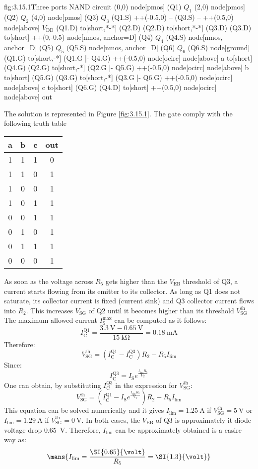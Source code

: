 \begin{circuit}{fig:3.15.1}{Three ports NAND circuit}
    (0,0) node[pmos] (Q1) {$Q_1$}
    (2,0) node[pmos] (Q2) {$Q_2$}
    (4,0) node[pmos] (Q3) {$Q_3$}
    (Q1.S) ++(-0.5,0) -- (Q3.S) -- ++(0.5,0)
    node[above] {$V_\text{DD}$}
    (Q1.D) to[short,*-*] (Q2.D)
    (Q2.D) to[short,*-*] (Q3.D)
    (Q3.D) to[short] ++(0,-0.5)
    node[nmos, anchor=D] (Q4) {$Q_4$}
    (Q4.S) node[nmos, anchor=D] (Q5) {$Q_5$}
    (Q5.S) node[nmos, anchor=D] (Q6) {$Q_6$}
    (Q6.S) node[ground] {}
    (Q1.G) to[short,-*] (Q1.G |- Q4.G)
    ++(-0.5,0)
    node[ocirc] {}
    node[above] {a}
    to[short] (Q4.G)
    (Q2.G) to[short,-*] (Q2.G |- Q5.G)
    ++(-0.5,0)
    node[ocirc] {}
    node[above] {b}
    to[short] (Q5.G)
    (Q3.G) to[short,-*] (Q3.G |- Q6.G)
    ++(-0.5,0)
    node[ocirc] {}
    node[above] {c}
    to[short] (Q6.G)
    (Q4.D) to[short] ++(0.5,0)
    node[ocirc] {}
    node[above] {out}
\end{circuit}
The solution is represented in Figure \ref{fig:3.15.1}. The gate comply with the following truth table
\begin{center}
\begin{tabular}{c c c | c}
    a & b & c & out \\
    \hline
    1 & 1 & 1 & 0 \\
    1 & 1 & 0 & 1 \\
    1 & 0 & 0 & 1 \\
    1 & 0 & 1 & 1 \\
    0 & 0 & 1 & 1 \\
    0 & 1 & 0 & 1 \\
    0 & 1 & 1 & 1 \\
    0 & 0 & 0 & 1 \\
\end{tabular}
\end{center}

As soon as the voltage across $R_5$ gets higher than the $V_\text{EB}$ threshold of Q3, a current starts flowing from its emitter to its collector. As long as Q1 does not saturate, its collector current is fixed (current sink) and Q3 collector current flows into $R_2$. This increases $V_\text{SG}$ of Q2 until it becomes higher than its threshold $V_\text{SG}^\text{th}$
The maximum allowed current $I_\text{S}^\text{max}$ can be computed as it follows:
\[I_\text{C}^\text{Q1}=\frac{\SI{3.3}{\volt}-\SI{0.65}{\volt}}{\SI{15}{\kilo\ohm}}=\SI{0.18}{\milli\ampere}\]
Therefore:
\[V_\text{SG}^\text{th}=(I_\text{C}^\text{Q1}-I_\text{C}^\text{Q3})R_2-R_5I_\text{lim}\]
Since:
\[I_\text{C}^\text{Q3}=I_\text{S}e^\frac{I_\text{lim}R_5}{V_\text{T}}\]
One can obtain, by substituting $I_\text{C}^\text{Q3}$ in the expression for $V_\text{SG}^\text{th}$:
\[V_\text{SG}^\text{th}=(I_\text{C}^\text{Q1}-I_\text{S}e^\frac{I_\text{lim}R_5}{V_\text{T}})R_2-R_5I_\text{lim}\]
This equation can be solved numerically and it gives $I_\text{lim}=\SI{1.25}{\ampere}$ if $V_\text{SG}^\text{th}=\SI{5}{\volt}$ or $I_\text{lim}=\SI{1.29}{\ampere}$ if $V_\text{SG}^\text{th}=\SI{0}{\volt}$.
In both cases, the $V_\text{EB}$ of Q3 is approximately it diode voltage drop \SI{0.65}{\volt}. Therefore,  $I_\text{lim}$ can be approximately obtained is a easire way as:
\[\mans{I_\text{lim}=\frac{\SI{0.65}{\volt}}{R_5}=\SI{1.3}{\volt}}\]

